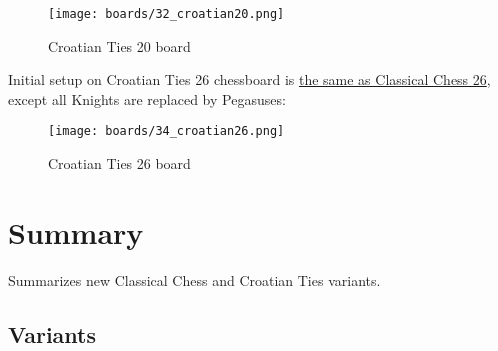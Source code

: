 \noindent
\begin{figure}[h]
\texttt{[image: boards/32\_croatian20.png]}
\caption{Croatian Ties 20 board}
\label{fig:32_croatian20}
\end{figure}

\vfill{}

\clearpage %

Initial setup on Croatian Ties 26 chessboard is
\hyperref[fig:28_classic26]{the same as Classical Chess 26}, except all Knights
are replaced by Pegasuses:

\noindent
\begin{figure}[h]
\texttt{[image: boards/34\_croatian26.png]}
\caption{Croatian Ties 26 board}
\label{fig:34_croatian26}
\end{figure}

\vfill{}

\clearpage %

\section*{Summary}
\label{sec:Simple variants/Summary}

Summarizes new Classical Chess and Croatian Ties variants.

\subsection*{Variants}
\label{sec:Simple variants/Summary/Variants}

